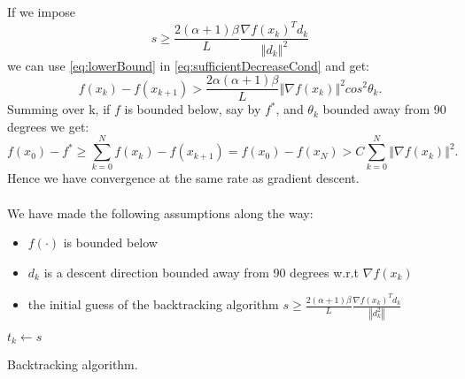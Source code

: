 \documentclass{article}
\newcommand{\norm}[1]{\left\Vert #1 \right\Vert}
\begin{document}
If we impose
\begin{equation}
s\geq\frac{2(\alpha+1)\beta}{L}\frac{\nabla f(x_k)^Td_k}{\norm{d_k}^2}
\end{equation}
we can use \ref{eq:lowerBound} in \ref{eq:sufficientDecreaseCond} and get:
\begin{equation}
f(x_k) - f(x_{k+1}) > \frac{2\alpha(\alpha+1)\beta}{L} \norm{\nabla f(x_k)}^2 cos^2\theta_k.
\end{equation}
Summing over k, if $f$ is bounded below, say by $f^*$, and $\theta_k$ bounded away from 90 degrees we get:
\begin{equation}
	f(x_0)-f^* \geq \sum_{k=0}^N f(x_k) - f(x_{k+1})  = f(x_0)-f(x_N) > C\sum_{k=0}^N\norm{\nabla f(x_k)}^2.
\end{equation}
Hence we have convergence at the same rate as gradient descent.\\\\
We have made the following assumptions along the way:
\begin{itemize}
	\item $f(\cdot)$ is bounded below
	\item $d_k$ is a descent direction bounded away from 90 degrees w.r.t $\nabla f(x_k)$
	\item the initial guess of the backtracking algorithm $s\geq\frac{2(\alpha+1)\beta}{L}\frac{\nabla f(x_k)^Td_k}{\norm{d_k^2}}$
\end{itemize}


\begin{algorithm}[!h]
	$t_k\gets s$\\
	\caption{Backtracking algorithm.}
	\label{algo:backtracking}
\end{algorithm}
 
\end{document}
